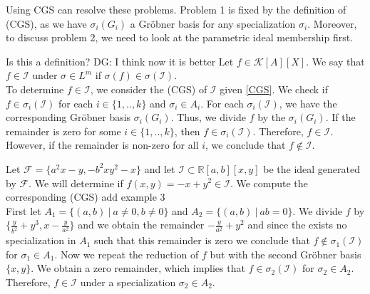 \documentclass[runningheads]{llncs}
\newcommand{\Rr}{\mathbb{R}}
\newcommand{\1}{\chi}
\newcommand{\Ff}{\mathcal{F}}
\newcommand{\Ii}{\mathcal{I}}
\newcommand{\Kk}{\mathcal{K}}
\begin{document}
Using CGS can resolve these problems. Problem 1 is fixed by the definition of (CGS), as we have $\sigma_i(G_i)$ a 
 Gr{\"o}bner basis for any specialization $\sigma_i$. Moreover, 
 to discuss problem 2, we need to look at the parametric ideal membership first.

{\color{red} Is this a definition? DG: I think now it is better }
Let $f\in \Kk[A][X]$. We say that $f\in\Ii$ under 
 $\sigma\in L^m$ if  $\sigma(f)\in\sigma(\Ii)$.\\

To determine  $f\in\Ii$, we consider the (CGS) of $\Ii$ given \ref{CGS}. 
We check if $f\in\sigma_i(\Ii)$ for each $i\in\{1,..,k\}$ and $\sigma_i\in A_i$.
For each $\sigma_i(\Ii)$, we have the corresponding Gr{\"o}bner basis $\sigma_i(G_i)$. Thus, 
we divide $f$ by the $\sigma_i(G_i)$. If the remainder is zero for some $i\in\{1,..,k\}$,
then $f\in\sigma_i(\Ii)$. Therefore, $f\in\Ii$. However, if the remainder is non-zero for all $i$, we conclude that 
$f\notin\Ii$.

\begin{example}
	Let $\Ff=\{a^2 x - y, -b^2 x y^2 - x\}$ and let $\mathcal{I}\subset \Rr[a,b][x,y]$ be the ideal generated by 
    $\Ff$.
	We will determine if $f(x,y)=-x+y^2\in\mathcal{I}$.
	We compute the corresponding (CGS)
	{\color{red} add example 3}\\
	First let $A_1=\{(a,b)~|~ a\ne 0, b\ne 0\}$ and $A_2=\{(a,b)~|~ ab=0\}$. 
	We divide $f$ by $\{\frac{y}{b^2}+y^3,x-\frac{y}{a^2}\}$ and we obtain the remainder $-\frac{y}{a^2}+y^2$ and 
	since the exists no specialization in $A_1$ such that this remainder is zero we conclude that $f\notin \sigma_1(\Ii)$ for
	$\sigma_1\in A_1$. Now we repeat the reduction of $f$ but with the second Gr{\"o}bner basis $\{x,y\}$. We obtain a zero remainder, which implies that 
	$f\in \sigma_2(\Ii)$ for $\sigma_2\in A_2$. Therefore, $f\in\Ii$ under a specialization $\sigma_2\in A_2$.
\end{example}
\end{document}
